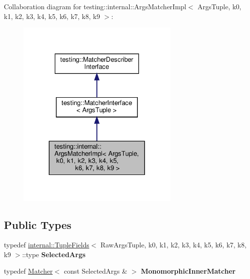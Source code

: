 Collaboration diagram for testing\+:\+:internal\+:\+:Args\+Matcher\+Impl$<$ Args\+Tuple, k0, k1, k2, k3, k4, k5, k6, k7, k8, k9 $>$\+:
\nopagebreak
\begin{figure}[H]
\begin{center}
\leavevmode
\includegraphics[width=227pt]{classtesting_1_1internal_1_1_args_matcher_impl__coll__graph}
\end{center}
\end{figure}
\subsection*{Public Types}
\begin{DoxyCompactItemize}
\item 
\mbox{\label{classtesting_1_1internal_1_1_args_matcher_impl_ab061679f6251e56ccbedaf0c316d00ff}} 
typedef \hyperlink{classtesting_1_1internal_1_1_tuple_fields}{internal\+::\+Tuple\+Fields}$<$ Raw\+Args\+Tuple, k0, k1, k2, k3, k4, k5, k6, k7, k8, k9 $>$\+::type {\bfseries Selected\+Args}
\item 
\mbox{\label{classtesting_1_1internal_1_1_args_matcher_impl_ab90d2c074b2072d6c39bf26209fb941f}} 
typedef \hyperlink{classtesting_1_1_matcher}{Matcher}$<$ const Selected\+Args \& $>$ {\bfseries Monomorphic\+Inner\+Matcher}
\end{DoxyCompactItemize}

